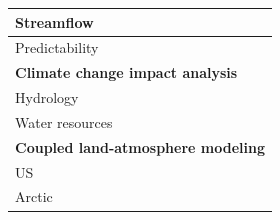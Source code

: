 \documentclass[gmd, manuscript]{copernicus}
\begin{document}
\begin{table}[]
{\begin{tabular}{l|l|}
    \multicolumn{1}{|l|}{Streamflow}              & \citet{Hamlet_1999,Li_2009,Wood_2002}  \\ \hline
    \multicolumn{1}{|l|}{Predictability}          & \citet{Gebregiorgis_2011,Maurer_2003}  \\ \hline
    \multicolumn{2}{|l|}{\textbf{Climate change impact analysis}}  \\ \hline
    \multicolumn{1}{|l|}{Hydrology}               & \citet{Barnett_2005,Beyene_2010,Nijssen_2001b}  \\ \hline
    \multicolumn{1}{|l|}{Water resources}         & \citet{Christensen_2007,Christensen_2004,Das_2011,Hamlet_1999}  \\ \hline
    \multicolumn{2}{|l|}{\textbf{Coupled land-atmosphere modeling}}  \\ \hline
    \multicolumn{1}{|l|}{US}                      & \citet{Zhu_2009}  \\ \hline
    \multicolumn{1}{|l|}{Arctic}                  & \citet{Hamman_2016a} \\ \hline
  \end{tabular}
  }
\end{table}
\end{document}
